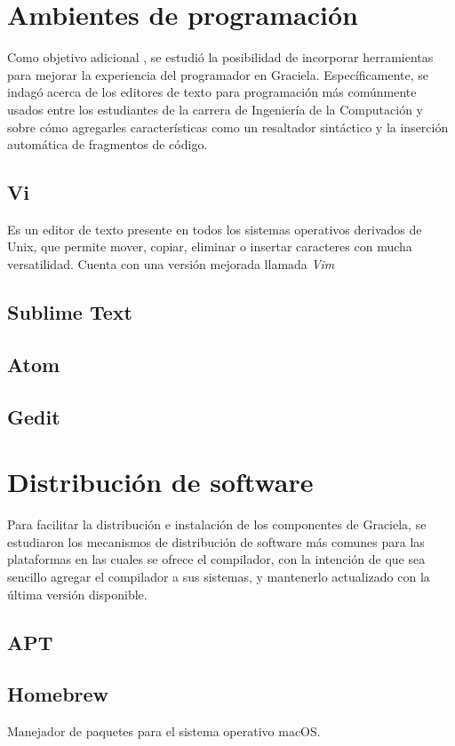 \section{Ambientes de programación}

Como objetivo adicional , se estudió la posibilidad de
incorporar herramientas para mejorar la experiencia del programador en Graciela.
Específicamente, se indagó acerca de los editores de texto para programación más
comúnmente usados entre los estudiantes de la carrera de Ingeniería de la
Computación y sobre cómo agregarles características como un resaltador
sintáctico y la inserción automática de fragmentos de código.

\subsection{Vi}

Es un editor de texto presente en todos los sistemas operativos derivados de
Unix, que  permite mover, copiar, eliminar o insertar caracteres con mucha
versatilidad. Cuenta con una versión mejorada llamada \textit{Vim}

\subsection{Sublime Text}

\subsection{Atom}

\subsection{Gedit}

\section{Distribución de software}

Para facilitar la distribución e instalación de los componentes de Graciela, se
estudiaron los mecanismos de distribución de software más comunes para las
plataformas en las cuales se ofrece el compilador, con la intención de que sea
sencillo agregar el compilador a sus sistemas, y mantenerlo actualizado con la
última versión disponible.

\subsection{APT}

\subsection{Homebrew}

Manejador de paquetes para el sistema operativo macOS.
